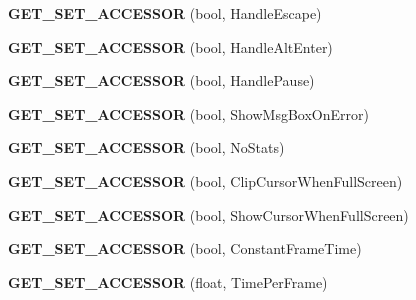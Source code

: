 \begin{DoxyCompactItemize}
\item 
\hypertarget{class_d_x_u_t_state_a688f621900032a21cb8066f07662a8e9}{{\bfseries G\+E\+T\+\_\+\+S\+E\+T\+\_\+\+A\+C\+C\+E\+S\+S\+O\+R} (bool, Handle\+Escape)}\label{class_d_x_u_t_state_a688f621900032a21cb8066f07662a8e9}

\item 
\hypertarget{class_d_x_u_t_state_a981afeeb5288f87cb108aea494aeb8b1}{{\bfseries G\+E\+T\+\_\+\+S\+E\+T\+\_\+\+A\+C\+C\+E\+S\+S\+O\+R} (bool, Handle\+Alt\+Enter)}\label{class_d_x_u_t_state_a981afeeb5288f87cb108aea494aeb8b1}

\item 
\hypertarget{class_d_x_u_t_state_a681b17257e6c4da446430e52b6d2a208}{{\bfseries G\+E\+T\+\_\+\+S\+E\+T\+\_\+\+A\+C\+C\+E\+S\+S\+O\+R} (bool, Handle\+Pause)}\label{class_d_x_u_t_state_a681b17257e6c4da446430e52b6d2a208}

\item 
\hypertarget{class_d_x_u_t_state_a44b27d2dd1faa77b891d872072cf1c74}{{\bfseries G\+E\+T\+\_\+\+S\+E\+T\+\_\+\+A\+C\+C\+E\+S\+S\+O\+R} (bool, Show\+Msg\+Box\+On\+Error)}\label{class_d_x_u_t_state_a44b27d2dd1faa77b891d872072cf1c74}

\item 
\hypertarget{class_d_x_u_t_state_a1b5b19c4a6f615466138fe64650e5327}{{\bfseries G\+E\+T\+\_\+\+S\+E\+T\+\_\+\+A\+C\+C\+E\+S\+S\+O\+R} (bool, No\+Stats)}\label{class_d_x_u_t_state_a1b5b19c4a6f615466138fe64650e5327}

\item 
\hypertarget{class_d_x_u_t_state_ae283ff2e049bdfeea771c4455f22cd45}{{\bfseries G\+E\+T\+\_\+\+S\+E\+T\+\_\+\+A\+C\+C\+E\+S\+S\+O\+R} (bool, Clip\+Cursor\+When\+Full\+Screen)}\label{class_d_x_u_t_state_ae283ff2e049bdfeea771c4455f22cd45}

\item 
\hypertarget{class_d_x_u_t_state_a7837099484fc89dcfbe7e946ddfa110b}{{\bfseries G\+E\+T\+\_\+\+S\+E\+T\+\_\+\+A\+C\+C\+E\+S\+S\+O\+R} (bool, Show\+Cursor\+When\+Full\+Screen)}\label{class_d_x_u_t_state_a7837099484fc89dcfbe7e946ddfa110b}

\item 
\hypertarget{class_d_x_u_t_state_a467c802afbcd8e51a8ccf569107eed64}{{\bfseries G\+E\+T\+\_\+\+S\+E\+T\+\_\+\+A\+C\+C\+E\+S\+S\+O\+R} (bool, Constant\+Frame\+Time)}\label{class_d_x_u_t_state_a467c802afbcd8e51a8ccf569107eed64}

\item 
\hypertarget{class_d_x_u_t_state_a2cf24d275f714d043aa07c7f84f057fe}{{\bfseries G\+E\+T\+\_\+\+S\+E\+T\+\_\+\+A\+C\+C\+E\+S\+S\+O\+R} (float, Time\+Per\+Frame)}\label{class_d_x_u_t_state_a2cf24d275f714d043aa07c7f84f057fe}


\end{DoxyCompactItemize}
